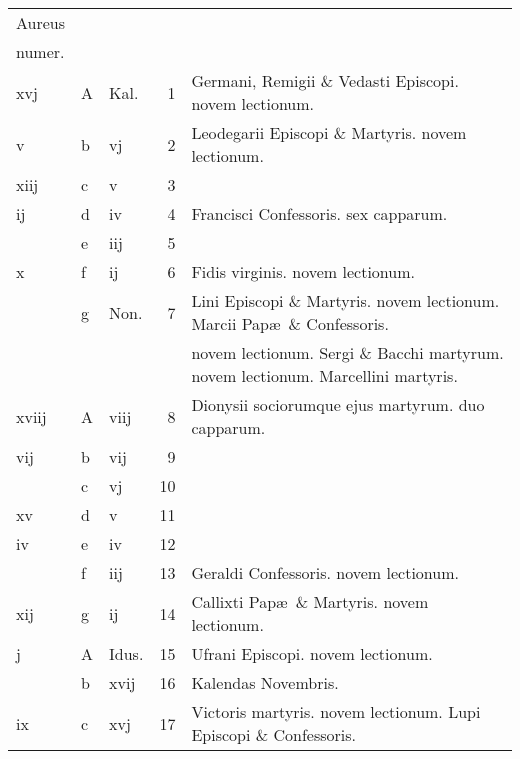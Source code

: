 \documentclass[letter,11pt]{book}
\begin{document}
\begin{center}
\begin{tabular}{l | l | l | r | l}
\color{Red}Aureus & & & \\
\color{Red}numer. & & & \\
\color{Red} xvj & \color{Red} A & \color{Red} Kal. & 1 & Germani, Remigii \& Vedasti Episcopi. \color{Red} novem lectionum. \\
\color{Red} v & b & \color{Red} vj & 2 & Leodegarii Episcopi \& Martyris. \color{Red} novem lectionum. \\
\color{Red} xiij & c & \color{Red} v & 3 & \\
\color{Red} ij & d & \color{Red} iv & 4 & \color{Red} Francisci Confessoris. \color{black} sex capparum. \\
\color{Red}  & e & \color{Red} iij & 5 & \\
\color{Red} x & f & \color{Red} ij & 6 & Fidis virginis. \color{Red} novem lectionum. \\
\color{Red}  & g & Non. & 7 & Lini Episcopi \& Martyris. \color{Red} novem lectionum. \color{black} Marcii Pap\ae \ \& Confessoris. \\
 &  &  &  & \quad \color{Red} novem lectionum. \color{black} Sergi \& Bacchi martyrum. \color{Red} novem lectionum. \color{black} Marcellini martyris. \\
\color{Red} xviij & \color{Red} A & \color{Red} viij & 8 & Dionysii sociorumque ejus martyrum. \color{Red} duo capparum. \\
\color{Red} vij & b & \color{Red} vij & 9 & \\
\color{Red}  & c & \color{Red} vj & 10 & \\
\color{Red} xv & d & \color{Red} v & 11 & \\
\color{Red} iv & e & \color{Red} iv & 12 & \\
\color{Red}  & f & \color{Red} iij & 13 & Geraldi Confessoris. \color{Red} novem lectionum. \\
\color{Red} xij & g & \color{Red} ij & 14 & Callixti Pap\ae \ \& Martyris. \color{Red} novem lectionum. \\
\color{Red} j & \color{Red} A & Idus. & 15 & Ufrani Episcopi. \color{Red} novem lectionum. \\%
\color{Red}  & b & \color{Red} xvij & 16 & \qquad \color{Red} Kalendas Novembris. \\
\color{Red} ix & c & \color{Red} xvj & 17 & Victoris martyris. \color{Red} novem lectionum. \color{black} Lupi Episcopi \& Confessoris. \\

\end{tabular}
\end{center}
\end{document}
